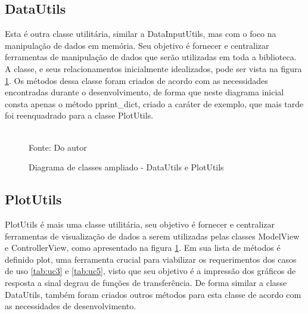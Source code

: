 \subsection{DataUtils}

Esta é outra classe utilitária, similar a DataInputUtils, mas com o foco na manipulação de dados em memória.
Seu objetivo é fornecer e centralizar ferramentas de manipulação de dados que serão utilizadas em toda a biblioteca.
A classe, e seus relacionamentos inicialmente idealizados, pode ser vista na figura \ref{fig:class_diag_dupu}.
Os métodos dessa classe foram criados de acordo com as necessidades encontradas durante o desenvolvimento, de forma que
neste diagrama inicial consta apenas o método pprint\_dict, criado a caráter de exemplo, que mais tarde foi reenquadrado
para a classe PlotUtils.

\begin{figure}[H]
    \centering
    \caption{Diagrama de classes ampliado - DataUtils e PlotUtils}
    \label{fig:class_diag_dupu}
    \\
    \vspace{0cm}\hspace{0cm}\small{Fonte: Do autor}
\end{figure}

\subsection{PlotUtils}

PlotUtils é mais uma classe utilitária, seu objetivo é fornecer e centralizar ferramentas de visualização de dados
a serem utilizadas pelas classes ModelView e ControllerView, como apresentado na figura \ref{fig:class_diag_dupu}.
Em sua lista de métodos é definido plot, uma ferramenta crucial para viabilizar os requerimentos dos casos de uso
\ref{tab:uc3} e \ref{tab:uc5}, visto que seu objetivo é a impressão dos gráficos de resposta a sinal degrau de funções de
transferência.
De forma similar a classe DataUtils, também foram criados outros métodos para esta classe de acordo com as necessidades de
desenvolvimento.

